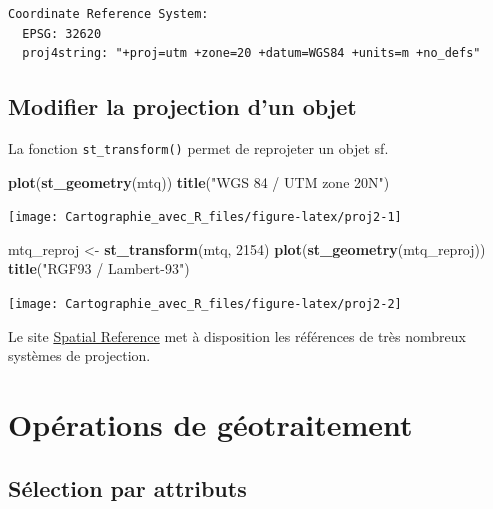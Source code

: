 \documentclass[]{book}
\newenvironment{Shaded}{\begin{snugshade}}{\end{snugshade}}
\newcommand{\KeywordTok}[1]{\textcolor[rgb]{0.13,0.29,0.53}{\textbf{#1}}}
\newcommand{\DecValTok}[1]{\textcolor[rgb]{0.00,0.00,0.81}{#1}}
\newcommand{\StringTok}[1]{\textcolor[rgb]{0.31,0.60,0.02}{#1}}
\newcommand{\NormalTok}[1]{#1}
\begin{document}
\begin{verbatim}
Coordinate Reference System:
  EPSG: 32620 
  proj4string: "+proj=utm +zone=20 +datum=WGS84 +units=m +no_defs"
\end{verbatim}

\subsection{Modifier la projection d'un
objet}\label{modifier-la-projection-dun-objet}

La fonction \texttt{st\_transform()} permet de reprojeter un objet sf.

\begin{Shaded}
\begin{Highlighting}[]
\KeywordTok{plot}\NormalTok{(}\KeywordTok{st_geometry}\NormalTok{(mtq))}
\KeywordTok{title}\NormalTok{(}\StringTok{"WGS 84 / UTM zone 20N"}\NormalTok{)}
\end{Highlighting}
\end{Shaded}

\begin{center}\texttt{[image: Cartographie\_avec\_R\_files/figure-latex/proj2-1]} \end{center}

\begin{Shaded}
\begin{Highlighting}[]
\NormalTok{mtq_reproj <-}\StringTok{ }\KeywordTok{st_transform}\NormalTok{(mtq, }\DecValTok{2154}\NormalTok{)}
\KeywordTok{plot}\NormalTok{(}\KeywordTok{st_geometry}\NormalTok{(mtq_reproj))}
\KeywordTok{title}\NormalTok{(}\StringTok{"RGF93 / Lambert-93"}\NormalTok{)}
\end{Highlighting}
\end{Shaded}

\begin{center}\texttt{[image: Cartographie\_avec\_R\_files/figure-latex/proj2-2]} \end{center}

Le site \href{http://spatialreference.org/}{Spatial Reference} met à
disposition les références de très nombreux systèmes de projection.

\section{Opérations de géotraitement}\label{operations-de-geotraitement}

\subsection{Sélection par attributs}\label{selection-par-attributs}
\end{document}
